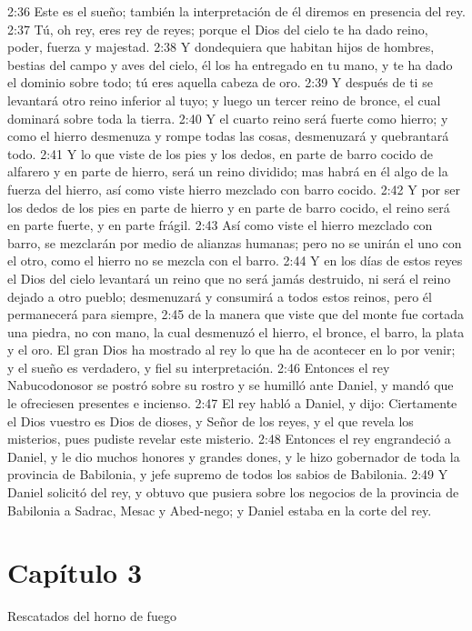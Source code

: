 2:36 Este es el sueño; también la interpretación de él diremos en presencia del rey. 
2:37 Tú, oh rey, eres rey de reyes; porque el Dios del cielo te ha dado reino, poder, fuerza y majestad. 
2:38 Y dondequiera que habitan hijos de hombres, bestias del campo y aves del cielo, él los ha entregado en tu mano, y te ha dado el dominio sobre todo; tú eres aquella cabeza de oro. 
2:39 Y después de ti se levantará otro reino inferior al tuyo; y luego un tercer reino de bronce, el cual dominará sobre toda la tierra. 
2:40 Y el cuarto reino será fuerte como hierro; y como el hierro desmenuza y rompe todas las cosas, desmenuzará y quebrantará todo. 
2:41 Y lo que viste de los pies y los dedos, en parte de barro cocido de alfarero y en parte de hierro, será un reino dividido; mas habrá en él algo de la fuerza del hierro, así como viste hierro mezclado con barro cocido. 
2:42 Y por ser los dedos de los pies en parte de hierro y en parte de barro cocido, el reino será en parte fuerte, y en parte frágil. 
2:43 Así como viste el hierro mezclado con barro, se mezclarán por medio de alianzas humanas; pero no se unirán el uno con el otro, como el hierro no se mezcla con el barro. 
2:44 Y en los días de estos reyes el Dios del cielo levantará un reino que no será jamás destruido, ni será el reino dejado a otro pueblo; desmenuzará y consumirá a todos estos reinos, pero él permanecerá para siempre, 
2:45 de la manera que viste que del monte fue cortada una piedra, no con mano, la cual desmenuzó el hierro, el bronce, el barro, la plata y el oro. El gran Dios ha mostrado al rey lo que ha de acontecer en lo por venir; y el sueño es verdadero, y fiel su interpretación. 
2:46 Entonces el rey Nabucodonosor se postró sobre su rostro y se humilló ante Daniel, y mandó que le ofreciesen presentes e incienso. 
2:47 El rey habló a Daniel, y dijo: Ciertamente el Dios vuestro es Dios de dioses, y Señor de los reyes, y el que revela los misterios, pues pudiste revelar este misterio. 
2:48 Entonces el rey engrandeció a Daniel, y le dio muchos honores y grandes dones, y le hizo gobernador de toda la provincia de Babilonia, y jefe supremo de todos los sabios de Babilonia. 
2:49 Y Daniel solicitó del rey, y obtuvo que pusiera sobre los negocios de la provincia de Babilonia a Sadrac, Mesac y Abed-nego; y Daniel estaba en la corte del rey. 
\section*{Capítulo 3 }
Rescatados del horno de fuego 
 
